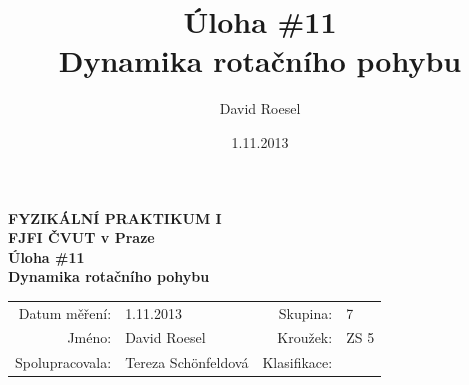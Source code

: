 \documentclass[english]{article}
\newcommand{\Author}{David Roesel}
\newcommand{\Coauthor}{Tereza Schönfeldová}
\newcommand{\Institute}{FJFI ČVUT v Praze}
\newcommand{\Subject}{FYZIKÁLNÍ PRAKTIKUM I}
\newcommand{\Group}{7}
\newcommand{\Circle}{ZS 5}
\newcommand{\Title}{Úloha \#11 \\Dynamika rotačního pohybu}
\newcommand{\Date}{1.11.2013}
\begin{document}
\author{\Author}
\title{\Title}
\date{\Date}

\renewcommand{\figurename}{Obr.}
\renewcommand{\tablename}{Tab.}
\renewcommand{\refname}{Reference}


\setlength{\parindent}{0cm}
\begin{multicols}{2}
\textbf{\Subject \\
        \Institute \\[0.1cm]
\Title \\[0.5cm]
}
\begin{tabular}{rlrl}
\large Datum měření: & \Date & \large Skupina: & \Group \\
\large Jméno: & \Author & \large Kroužek:  & \Circle\\
\large Spolupracovala: & \Coauthor &\large Klasifikace:\\
\end{tabular}


\end{multicols}
\end{document}

